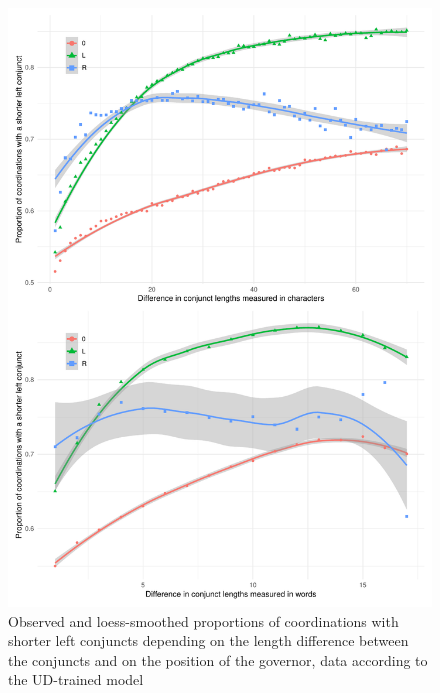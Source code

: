 \begin{figure}[hbt!]
    \includegraphics[width=\textwidth]{inputs/ud-observed.pdf}
    \caption{\centering Observed and loess-smoothed proportions of coordinations with shorter left conjuncts depending on the length difference between the conjuncts and on the position of the governor, data according to the UD-trained model}\label{fig:ud-observed}
\end{figure}

